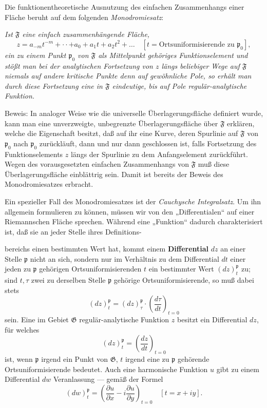 \documentclass{article}
\begin{document}
Die funktionentheoretische Ausnutzung des einfachen Zusammenhangs einer Fläche beruht auf dem folgenden \emph{Monodromiesatz}:

\emph{Ist $\mathfrak{F}$ eine einfach zusammenhängende Fläche,}
\[ z = a_{-m} t^{-m} + \cdot\cdot + a_0 + a_1 t + a_2 t^2 + \dots \quad [t = \text{Ortsuniformisierende zu } \mathfrak{p}_0], \]
\emph{ein zu einem Punkt $\mathfrak{p}_0$ von $\mathfrak{F}$ als Mittelpunkt gehöriges Funktionselement und stößt man bei der analytischen Fortsetzung von $z$ längs beliebiger Wege auf $\mathfrak{F}$ niemals auf andere kritische Punkte denn auf gewöhnliche Pole, so erhält man durch diese Fortsetzung eine in $\mathfrak{F}$ eindeutige, bis auf Pole regulär-analytische Funktion.}

Beweis: In analoger Weise wie die universelle Überlagerungsfläche definiert wurde, kann man eine unverzweigte, unbegrenzte Überlagerungsfläche über $\mathfrak{F}$ erklären, welche die Eigenschaft besitzt, daß auf ihr eine Kurve, deren Spurlinie auf $\mathfrak{F}$ von $\mathfrak{p}_0$ nach $\mathfrak{p}_0$ zurückläuft, dann und nur dann geschlossen ist, falls Fortsetzung des Funktionselements $z$ längs der Spurlinie zu dem Anfangselement zurückführt. Wegen des vorausgesetzten einfachen Zusammenhangs von $\mathfrak{F}$ muß diese Überlagerungsfläche einblättrig sein. Damit ist bereits der Beweis des Monodromiesatzes erbracht.

Ein spezieller Fall des Monodromiesatzes ist der \emph{Cauchysche Integralsatz}. Um ihn allgemein formulieren zu können, müssen wir von den „Differentialen“ auf einer Riemannschen Fläche sprechen. Während eine „Funktion“ dadurch charakterisiert ist, daß sie an jeder Stelle ihres Definitions-

bereichs einen bestimmten Wert hat, kommt einem \textbf{Differential} $dz$ an einer Stelle $\mathfrak{p}$ nicht an sich, sondern nur im Verhältnis zu dem Differential $dt$ einer jeden zu $\mathfrak{p}$ gehörigen Ortsuniformisierenden $t$ ein bestimmter Wert $(dz)_t^\mathfrak{p}$ zu; sind $t, \tau$ zwei zu derselben Stelle $\mathfrak{p}$ gehörige Ortsuniformisierende, so muß dabei stets
\[ (dz)_t^\mathfrak{p} = (dz)_\tau^\mathfrak{p} \cdot \left(\frac{d\tau}{dt}\right)_{t = 0} \]
sein. Eine im Gebiet $\mathfrak{G}$ regulär-analytische Funktion $z$ besitzt ein Differential $dz$, für welches
\[ (dz)_t^\mathfrak{p} = \left(\frac{dz}{dt}\right)_{t = 0} \]
ist, wenn $\mathfrak{p}$ irgend ein Punkt von $\mathfrak{G}$, $t$ irgend eine zu $\mathfrak{p}$ gehörende Ortsuniformisierende bedeutet. Auch eine harmonische Funktion $u$ gibt zu einem Differential $dw$ Veranlassung --- gemäß der Formel
\[ (dw)_t^\mathfrak{p} = \left(\frac{\partial u}{\partial x} - i \frac{\partial u}{\partial y}\right)_{t = 0} \quad [t = x + iy]. \]
\end{document}
